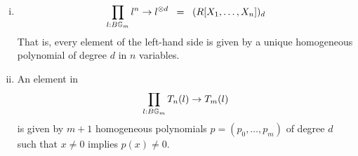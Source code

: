 \begin{lemma}\label{hom}
  \begin{enumerate}[(i)]
    \item
      \[  \prod_{l:B\mathbb{G}_m}l^n\rightarrow l^{\otimes d} \;\;=\;\; (R[X_1, \dots, X_n])_d \]
      That is,
      every element of the left-hand side is given by
      a unique homogeneous polynomial of degree $d$ in $n$ variables.
    \item
      An element in
      $$\prod_{l:B\mathbb{G}_m}T_n(l)\rightarrow T_m(l)$$
      is given by $m+1$ homogeneous polynomials $p = (p_0,\dots,p_m)$ of degree $d$ such that
      $x\neq 0$ implies $p(x)\neq 0$.
  \end{enumerate}
\end{lemma}
